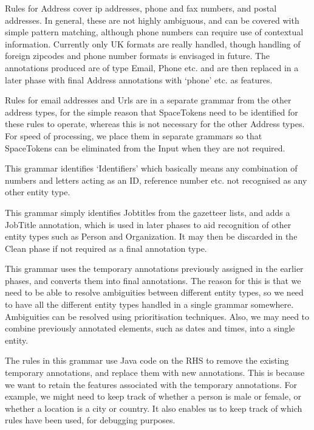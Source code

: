  

Rules for Address cover ip addresses, phone and fax
numbers, and postal addresses. In general, these are not highly ambiguous, and can be
covered with simple pattern matching, although phone numbers can
require use of contextual information. Currently only UK formats are
really handled, though handling of foreign zipcodes and
phone number formats is envisaged in future. The annotations produced
are of type Email, Phone etc. and are then replaced in a later phase
with final Address annotations with `phone' etc. as features.

Rules for email addresses and Urls are in a separate grammar from the
other address types, for the simple reason that SpaceTokens need to be
identified for these rules to operate, whereas this is not necessary
for the other Address types. For speed of processing, we place them in
separate grammars so that SpaceTokens can be eliminated from the Input
when they are not required.


This grammar identifies `Identifiers' which basically means any
combination of numbers and letters acting as an ID, reference number
etc. not recognised as any other entity type. 


This grammar simply identifies Jobtitles from the gazetteer lists, and
adds a JobTitle annotation, which is used in later phases to aid
recognition of other entity types such as Person and Organization. It
may then be discarded in the Clean phase if not required as a final
annotation type.



This grammar uses the temporary annotations previously assigned in
the earlier phases, and converts them into final annotations. The
reason for this is that we need to be able to resolve ambiguities
between different entity types, so we need to have all the different
entity types handled in a single grammar somewhere. Ambiguities can be
resolved using prioritisation techniques. Also, we may need to combine
previously annotated elements, such as dates and times, into a single
entity.

The rules in this grammar use Java code on the RHS to
remove the existing temporary annotations, and replace them with new
annotations. This is because we want to retain the features associated
with the temporary annotations. For example, we might need to keep
track of whether a person is male or female, or whether a location is
a city or country. It also enables us to keep track of which rules
have been used, for debugging purposes.

